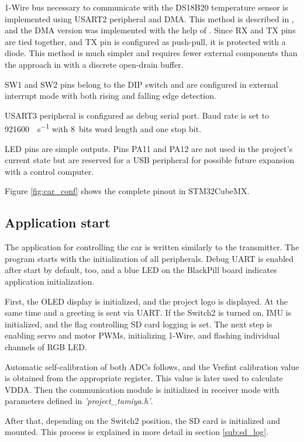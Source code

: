 1-Wire bus necessary to communicate with the DS18B20 temperature sensor is implemented using USART2 peripheral and DMA. This method is described in \cite{1wire_uart}, and the DMA version was implemented with the help of \cite{1wire_uart_imp}. Since RX and TX pins are tied together, and TX pin is configured as push-pull, it is protected with a diode. This method is much simpler and requires fewer external components than the approach in \cite{1wire_uart} with a discrete open-drain buffer.

SW1 and SW2 pins belong to the DIP switch and are configured in external interrupt mode with both rising and falling edge detection.

USART3 peripheral is configured as debug serial port. Baud rate is set to \SI{921600}{\bit\per\second} with 8~bits word length and one stop bit.

LED pins are simple outputs. Pins PA11 and PA12 are not used in the project's current state but are reserved for a USB peripheral for possible future expansion with a control computer.

Figure \ref{fig:car_conf} shows the complete pinout in STM32CubeMX.

\subsection{Application start}
The application for controlling the car is written similarly to the transmitter. The program starts with the initialization of all peripherals. Debug UART is enabled after start by default, too, and a blue LED on the BlackPill board indicates application initialization.

First, the OLED display is initialized, and the project logo is displayed. At the same time and a greeting is sent via UART. If the Switch2 is turned on, IMU is initialized, and the flag controlling SD card logging is set. The next step is enabling servo and motor PWMs, initializing 1-Wire, and flashing individual channels of RGB LED.

Automatic self-calibration of both ADCs follows, and the Vrefint calibration value is obtained from the appropriate register. This value is later used to calculate VDDA. Then the communication module is initialized in receiver mode with parameters defined in \textit{'project\_tamiya.h'}.

After that, depending on the Switch2 position, the SD card is initialized and mounted. This process is explained in more detail in section \ref{sub:sd_log}.

